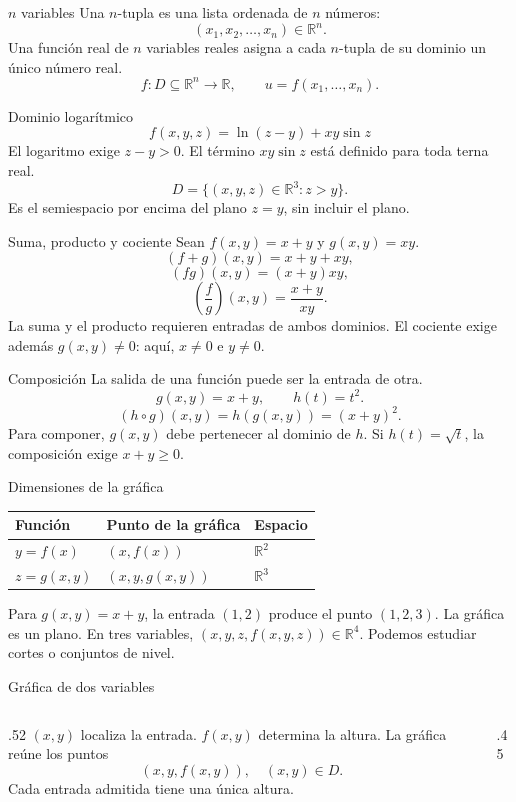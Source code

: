 \begin{frame}{$n$ variables}
Una $n$-tupla es una lista ordenada de $n$ números:
\[(x_1,x_2,\ldots,x_n)\in\mathbb R^n.\]
Una función real de $n$ variables reales asigna a cada $n$-tupla de su dominio un único número real.
\[f:D\subseteq\mathbb R^n\longrightarrow\mathbb R,\qquad u=f(x_1,\ldots,x_n).\]
\end{frame}
\begin{frame}{Dominio logarítmico}
\[f(x,y,z)=\ln(z-y)+xy\sin z\]
El logaritmo exige $z-y>0$. El término $xy\sin z$ está definido para toda terna real.
\[D=\{(x,y,z)\in\mathbb R^3:z>y\}.\]
Es el semiespacio por encima del plano $z=y$, sin incluir el plano.
\end{frame}
\begin{frame}{Suma, producto y cociente}
Sean $f(x,y)=x+y$ y $g(x,y)=xy$.
\[(f+g)(x,y)=x+y+xy,\]
\[(fg)(x,y)=(x+y)xy,\]
\[\left(\frac fg\right)(x,y)=\frac{x+y}{xy}.\]
La suma y el producto requieren entradas de ambos dominios.
\medskip
El cociente exige además $g(x,y)\ne0$: aquí, $x\ne0$ e $y\ne0$.
\end{frame}
\begin{frame}{Composición}
La salida de una función puede ser la entrada de otra.
\[g(x,y)=x+y,\qquad h(t)=t^2.\]
\[(h\circ g)(x,y)=h(g(x,y))=(x+y)^2.\]
Para componer, $g(x,y)$ debe pertenecer al dominio de $h$.
\medskip
Si $h(t)=\sqrt t$, la composición exige $x+y\ge0$.
\end{frame}
\begin{frame}{Dimensiones de la gráfica}
\begin{center}\begin{tabular}{lll}
Función & Punto de la gráfica & Espacio\\\hline
$y=f(x)$ & $(x,f(x))$ & $\mathbb R^2$\\[3mm]
$z=g(x,y)$ & $(x,y,g(x,y))$ & $\mathbb R^3$
\end{tabular}\end{center}
Para $g(x,y)=x+y$, la entrada $(1,2)$ produce el punto $(1,2,3)$. La gráfica es un plano.
\medskip
En tres variables, $(x,y,z,f(x,y,z))\in\mathbb R^4$. Podemos estudiar cortes o conjuntos de nivel.
\end{frame}
\begin{frame}{Gráfica de dos variables}
\begin{columns}[c]
\begin{column}{.52\textwidth}
$(x,y)$ localiza la entrada. $f(x,y)$ determina la altura.
\medskip
La gráfica reúne los puntos
\[(x,y,f(x,y)),\quad (x,y)\in D.\]
Cada entrada admitida tiene una única altura.
\end{column}
\begin{column}{.45\textwidth}\end{column}
\end{columns}
\end{frame}

